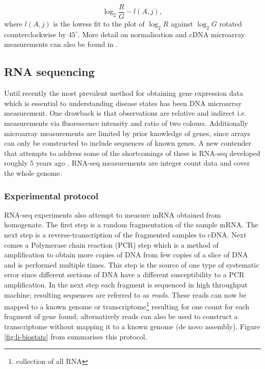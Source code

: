 \begin{equation}
  \label{eq:microarray-norm}
  \log_2 \frac{R}{G} - l(A, j), 
\end{equation}
where $l(A, j)$ is the lowess fit \citep{Cleveland:2012fu} to the plot of $\log_2 R$ against $\log_2 G$ rotated counterclockwise by $45^{\circ}$. More detail on normalisation and cDNA microarray measurements can also be found in \cite{Dudoit:2002va}. 

\subsection{RNA sequencing}
\label{sec:rna-sequencing}

Until recently the most prevalent method for obtaining gene expression data which is essential to understanding disease states has been DNA microarray measurement. One drawback is that observations are relative and indirect i.e. measurements via fluorescence intensity and ratio of two colours. Additionally microarray measurements are limited by prior knowledge of genes, since arrays can only be constructed to include sequences of known genes. A new contender that attempts to address some of the shortcomings of these is RNA-seq developed roughly $5$ years ago \citep{Mortazavi:2008jj, Nagalakshmi:2008cj}. RNA-seq measurements are integer count data and cover the whole genome. 

\subsubsection{Experimental protocol}
\label{sec:technique-bio}

RNA-seq experiments also attempt to measure mRNA obtained from homogenate. The first step is a random fragmentation of the sample mRNA. The next step is a reverse-transcription of the fragmented samples to cDNA. Next comes a Polymerase chain reaction (PCR) step which is a method of amplification to obtain more copies of DNA from few copies of a slice of DNA and is performed multiple times. This step is the source of one type of systematic error since different sections of  DNA have a different susceptibility to a PCR amplification. In the next step each fragment is sequenced in high throughput machine; resulting sequences are referred to as \emph{reads}. These reads can now be mapped to a known genome or transcriptome\footnote{collection of all RNA} resulting for one count for each fragment of gene found;  alternatively reads can also be used to construct a transcriptome without mapping it to a known genome (de novo assembly). Figure \ref{fig:li-biostats} from \cite{Li:2012ea} summarises this protocol. 

